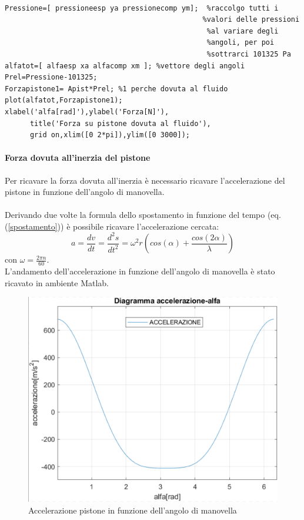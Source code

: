 \begin{lstlisting}[frame=trBL]
%Calcolo forza su pistone%

Pressione=[ pressioneesp ya pressionecomp ym];  %raccolgo tutti i 
                                               %valori delle pressioni 
                                                %al variare degli 
                                                %angoli, per poi 
                                                %sottrarci 101325 Pa
alfatot=[ alfaesp xa alfacomp xm ]; %vettore degli angoli
Prel=Pressione-101325;
Forzapistone1= Apist*Prel; %1 perche dovuta al fluido
plot(alfatot,Forzapistone1);
xlabel('alfa[rad]'),ylabel('Forza[N]'),
      title('Forza su pistone dovuta al fluido'),
      grid on,xlim([0 2*pi]),ylim([0 3000]);
\end{lstlisting}
\paragraph{Forza dovuta all'inerzia del pistone}Per ricavare la forza dovuta all’inerzia è necessario ricavare l’accelerazione del pistone in funzione dell’angolo di manovella.\\
\\
Derivando due volte la formula dello spostamento in funzione del tempo (eq.(\ref{spostamento})) è possibile ricavare l’accelerazione cercata:
\begin{equation}
    a=\frac{dv}{dt}=\frac{d^2s}{{dt}^2}=\omega^2r(cos(\alpha)+\frac{cos(2\alpha)}{\lambda})
\end{equation}
con $\omega=\frac{2\pi n}{60}$.
\\
L'andamento dell'accelerazione in funzione dell'angolo di manovella è stato ricavato in ambiente Matlab.
\begin{figure}[h]
    \centering
    \includegraphics[scale=0.35]{Immagini/GraficoAccelerazionePistone.png}
    \caption{Accelerazione pistone in funzione dell'angolo di manovella}
    \label{fig:GraficoAccelerazionePistone}
\end{figure}
